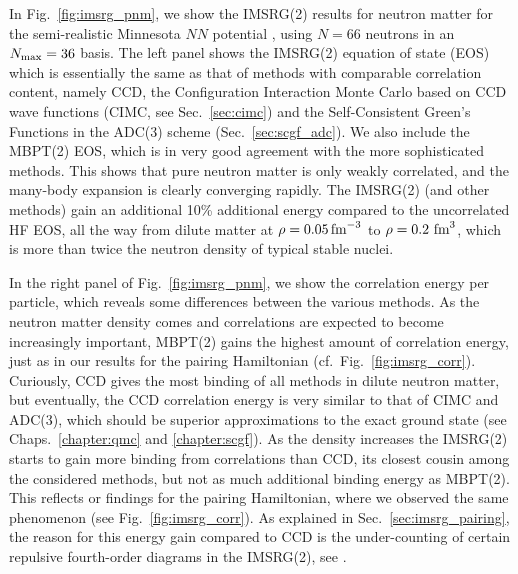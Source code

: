 {In Fig.~\ref{fig:imsrg_pnm}, we show the IMSRG(2) results for neutron matter
for the semi-realistic Minnesota $NN$ potential \cite{Thompson:1977fk},
using $N=66$ neutrons in an $N_\text{max}=36$ basis. The left panel shows the 
IMSRG(2) equation of state (EOS) which is essentially the same as that of 
methods with comparable correlation content, namely CCD, the Configuration 
Interaction Monte Carlo based on CCD wave functions (CIMC, see Sec.~\ref{sec:cimc}) 
and the Self-Consistent Green's Functions in the ADC(3) scheme 
(Sec.~\ref{sec:scgf_adc}). We also include the MBPT(2) EOS, which
is in very good agreement with the more sophisticated methods.
This shows that pure neutron matter is only weakly correlated, and
the many-body expansion is clearly converging rapidly. The IMSRG(2)
(and other methods) gain an additional 10\% additional energy compared
to the uncorrelated HF EOS, all the way from dilute matter at $\rho=0.05\,\text{fm}^{-3}$
to $\rho=0.2\,\,\text{fm}^3$, which is more than twice the neutron density of 
typical stable nuclei. 

In the right panel of Fig.~\ref{fig:imsrg_pnm}, we show the correlation 
energy per particle, which reveals some differences between the various
methods. As the neutron matter density comes and correlations are expected
to become increasingly important, MBPT(2) gains the highest amount of
correlation energy, just as in our results for the pairing Hamiltonian
(cf.~Fig.~\ref{fig:imsrg_corr}). Curiously, CCD gives the most binding
of all methods in dilute neutron matter, but eventually, the CCD correlation
energy is very similar to that of CIMC and ADC(3), which should be superior
approximations to the exact ground state (see Chaps.~\ref{chapter:qmc} and
\ref{chapter:scgf}). As the density increases the IMSRG(2) starts to gain
more binding from correlations than CCD, its closest cousin among the 
considered methods, but not as much additional binding energy as MBPT(2).
This reflects or findings for the pairing Hamiltonian, where we 
observed the same phenomenon (see Fig.~\ref{fig:imsrg_corr}). As explained
in Sec.~\ref{sec:imsrg_pairing}, the reason for this energy gain compared
to CCD is the under-counting of certain repulsive fourth-order diagrams
in the IMSRG(2), see \cite{Hergert:2016jk}.  




}
